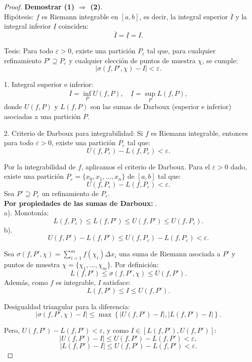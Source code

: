 \documentclass{article}
\begin{document}
	\begin{proof}\textbf{Demostrar (1) \(\Rightarrow\) (2)}.\\
	Hipótesis:
	\( f \) es Riemann integrable en \([a, b]\), es decir, la integral superior \( \overline{I} \) y la integral inferior \( \underline{I} \) coinciden:  
	\[
	\overline{I} = \underline{I} = I.
	\]
	
	Tesis:  
	Para todo \( \varepsilon > 0 \), existe una partición \( P_\varepsilon \) tal que, para cualquier refinamiento \( P' \supseteq P_\varepsilon \) y cualquier elección de puntos de muestra \( \chi \), se cumple:  
	\[
	|\sigma(f, P', \chi) - I| < \varepsilon.
	\]
	
	1. Integral superior e inferior:
	\[
	\overline{I} = \inf_{P} U(f, P), \quad \underline{I} = \sup_{P} L(f, P),
	\]  
	donde \( U(f, P) \) y \( L(f, P) \) son las sumas de Darboux (superior e inferior) asociadas a una partición \( P \).
	
	2. Criterio de Darboux para integrabilidad: 
	Si \( f \) es Riemann integrable, entonces para todo \( \varepsilon > 0 \), existe una partición \( P_\varepsilon \) tal que:  
	\[
	U(f, P_\varepsilon) - L(f, P_\varepsilon) < \varepsilon.
	\]
	
	Por la integrabilidad de \( f \), aplicamos el criterio de Darboux. Para el \( \varepsilon > 0 \) dado, existe una partición \( P_\varepsilon = \{x_0, x_1, \ldots, x_n\} \) de \([a, b]\) tal que:  
	\[
	U(f, P_\varepsilon) - L(f, P_\varepsilon) < \varepsilon.
	\]
	Sea \( P' \supseteq P_\varepsilon \) un refinamiento de \( P_\varepsilon \).\\ 
	\textbf{Por propiedades de las sumas de Darboux:}  .\\
	a). Monotonía:
	\[
	L(f, P_\varepsilon) \leq L(f, P') \leq U(f, P') \leq U(f, P_\varepsilon).
	\]  
	b). 
	\[
	U(f, P') - L(f, P') \leq U(f, P_\varepsilon) - L(f, P_\varepsilon) < \varepsilon.
	\]
	
	Sea \( \sigma(f, P', \chi) = \sum_{i=1}^m f(\chi_i) \Delta x_i \) una suma de Riemann asociada a \( P' \) y puntos de muestra \( \chi = \{\chi_1, \ldots, \chi_m\} \). Por definición:  
	\[
	L(f, P') \leq \sigma(f, P', \chi) \leq U(f, P').
	\]  
	Además, como \( f \) es integrable, \( I \) satisface:  
	\[
	L(f, P') \leq I \leq U(f, P').
	\]  
	
	Desigualdad triangular para la diferencia:  
	\[
	|\sigma(f, P', \chi) - I| \leq \max\left\{ |U(f, P') - I|, |L(f, P') - I| \right\}.
	\]  
	
	Pero, \( U(f, P') - L(f, P') < \varepsilon \), y como \( I \in [L(f, P'), U(f, P')] \):  
	\[
	|U(f, P') - I| \leq U(f, P') - L(f, P') < \varepsilon,
	\]  
	\[
	|L(f, P') - I| \leq U(f, P') - L(f, P') < \varepsilon.
	\]  
	

\end{proof}
\end{document}
